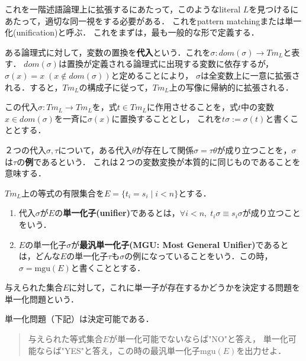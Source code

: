 \documentclass[uplatex, dvipdfmx]{jsreport}
\begin{document}
これを一階述語論理上に拡張するにあたって，このようなliteral $L$を見つけるにあたって，適切な同一視をする必要がある．
これをpattern matchingまたは単一化(unification)と呼ぶ．
これをまずは，最も一般的な形で定義する．

\begin{definition}[substitution]
    ある論理式に対して，変数の置換を\textbf{代入}という．これを$\sigma:dom(\sigma)\to Tm_L$と表す．
    $dom(\sigma)$は置換が定義される論理式に出現する変数に依存するが，$\sigma(x)=x\;(x\notin dom(\sigma))$と定めることにより，
    $\sigma$は全変数上に一意に拡張される．すると，$Tm_L$の構成子に従って，$Tm_L$上の写像に帰納的に拡張される．

    この代入$\sigma:Tm_L\to Tm_L$を，式$t\in Tm_L$に作用させることを，式$t$中の変数$x\in dom(\sigma)$を一斉に$\sigma(x)$に置換することとし，
    これを$t\sigma:=\sigma(t)$と書くこととする．
\end{definition}

\begin{definition}[instance]
    ２つの代入$\sigma,\tau$について，ある代入$\theta$が存在して関係$\sigma=\tau\theta$が成り立つことを，$\sigma$は$\tau$の\textbf{例}であるという．
    これは２つの変数変換が本質的に同じものであることを意味する．
\end{definition}

\begin{definition}[unifier]
    $Tm_L$上の等式の有限集合を$E=\{t_i=s_i\mid i<n\}$とする．
    \begin{enumerate}
        \item 代入$\sigma$が$E$の\textbf{単一化子(unifier)}であるとは，$\forall i<n,\; t_i\sigma\equiv s_i\sigma$が成り立つことをいう．
        \item $E$の単一化子$\sigma$が\textbf{最汎単一化子(MGU: Most General Unifier)}であるとは，どんな$E$の単一化子$\tau$も$\sigma$の例になっていることをいう．この時，$\sigma=\mathrm{mgu}(E)$と書くこととする．
    \end{enumerate}
    与えられた集合$E$に対して，これに単一子が存在するかどうかを決定する問題を単一化問題という．
\end{definition}

\begin{theorem}
    単一化問題（下記）は決定可能である．
    \begin{quote}
        与えられた等式集合$E$が単一化可能でないならば"NO"と答え，
        単一化可能ならば"YES"と答え，この時の最汎単一化子$\mathrm{mgu}(E)$を出力せよ．
    \end{quote}
\end{theorem}
\end{document}
